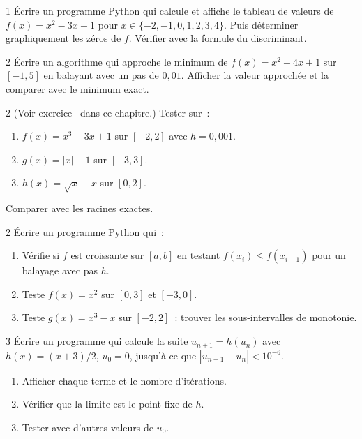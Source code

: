 \begin{bilan}
\begin{exo}{1}
\'Ecrire un programme Python qui calcule et affiche le tableau de valeurs
de $f(x)=x^2-3x+1$ pour $x\in\{-2,-1,0,1,2,3,4\}$.
Puis d\'eterminer graphiquement les z\'eros de $f$.
V\'erifier avec la formule du discriminant.
\end{exo}

\begin{exo}{2}
\'Ecrire un algorithme qui approche le minimum de $f(x)=x^2-4x+1$
sur $[-1,5]$ en balayant avec un pas de $0{,}01$.
Afficher la valeur approch\'ee et la comparer avec le minimum exact.
\end{exo}

\begin{exo}{2}
(Voir exercice \logicoalgo\ dans ce chapitre.)
Tester sur~:
\begin{enumerate}
  \item $f(x)=x^3-3x+1$ sur $[-2,2]$ avec $h=0{,}001$.
  \item $g(x)=|x|-1$ sur $[-3,3]$.
  \item $h(x)=\sqrt{x}-x$ sur $[0,2]$.
\end{enumerate}
Comparer avec les racines exactes.
\end{exo}

\begin{exo}{2}
\'Ecrire un programme Python qui~:
\begin{enumerate}
  \item V\'erifie si $f$ est croissante sur $[a,b]$ en testant
        $f(x_i)\leq f(x_{i+1})$ pour un balayage avec pas $h$.
  \item Teste $f(x)=x^2$ sur $[0,3]$ et $[-3,0]$.
  \item Teste $g(x)=x^3-x$ sur $[-2,2]$~: trouver les sous-intervalles
        de monotonie.
\end{enumerate}
\end{exo}

\begin{exo}{3}
\'Ecrire un programme qui calcule la suite $u_{n+1}=h(u_n)$
avec $h(x)=(x+3)/2$, $u_0=0$, jusqu'\`a ce que $|u_{n+1}-u_n|<10^{-6}$.
\begin{enumerate}
  \item Afficher chaque terme et le nombre d'it\'erations.
  \item V\'erifier que la limite est le point fixe de $h$.
  \item Tester avec d'autres valeurs de $u_0$.
\end{enumerate}
\end{exo}


\end{bilan}

